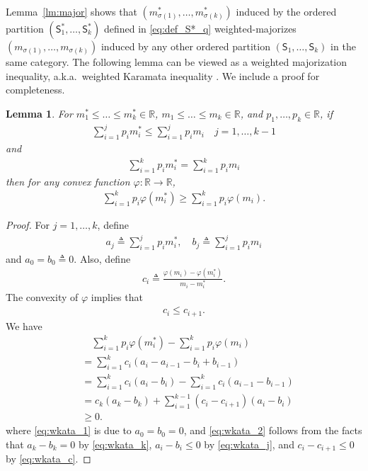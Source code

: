 \documentclass[conference]{IEEEtran}
\newtheorem{lemma}{Lemma}
\newcommand{\R}{\mathbb{R}}
\def\sS{{\mathsf S}}
\def\deq{\triangleq}
\begin{document}
Lemma~\ref{lm:major} shows that $(m^*_{\sigma(1)}, \ldots , m^*_{\sigma(k)})$ induced by the ordered partition $(\sS^*_1,\ldots,\sS^*_k)$ defined in \eqref{eq:def_S*_q} weighted-majorizes $( m_{\sigma(1)}, \ldots , m_{\sigma(k)})$ induced by any other ordered partition $(\sS_1,\ldots,\sS_k)$ in the same category.
The following lemma can be viewed as a weighted majorization inequality, a.k.a.\ weighted Karamata inequality \cite{Fuchs_weighted, Majorization_inequalities_IT}. 
We include a proof for completeness.
\begin{lemma}\label{lm:wkata}
For $m^*_1 \le \ldots \le m^*_k \in \R$, $m_{1} \le \ldots \le m_{k} \in \R$, and $p_1,\ldots, p_k \in \R$, if
\begin{align}
    \sum_{i=1}^j p_{i} m^*_{i}
    \le
    \sum_{i=1}^j p_{i} m_{i} \quad j=1,\ldots, k-1 \label{eq:wkata_j}
\end{align}
and 
\begin{align}
    \sum_{i=1}^k p_{i} m^*_{i}
    =
    \sum_{i=1}^k p_{i} m_{i} \label{eq:wkata_k}
\end{align}
then for any convex function $\varphi: \R \rightarrow \R$,
\begin{align}
    \sum_{i=1}^k p_{i} \varphi(m^*_{i})
    \ge
    \sum_{i=1}^k p_{i} \varphi( m_{i} ) .
\end{align}
\end{lemma}
\begin{proof}
For $j=1,\ldots,k$, define
\begin{align}
a_j \deq \sum_{i=1}^j p_i m^*_i, \quad
b_j \deq  \sum_{i=1}^j p_i m_i
\end{align}
and $a_0 = b_0 \deq 0$.
Also, define
\begin{align}
c_i \deq \frac{\varphi(m_i) - \varphi(m^*_i)}{m_i - m^*_i} .
\end{align}
The convexity of $\varphi$ implies that
\begin{align}
    c_i \le c_{i+1} . \label{eq:wkata_c}
\end{align}
We have
\begin{align}
    & \quad \sum_{i=1}^k p_{i} \varphi(m^*_{i})
    -
    \sum_{i=1}^k p_{i} \varphi( m_{i} ) \nonumber \\
    &= \sum_{i=1}^k c_i (a_i - a_{i-1} - b_i + b_{i-1}) \\
    &= \sum_{i=1}^k c_i (a_i - b_i)
    - \sum_{i=1}^k c_i (a_{i-1} - b_{i-1}) \\
    &= c_k(a_k-b_k) + \sum_{i=1}^{k-1}(c_i - c_{i+1})(a_i - b_i) \label{eq:wkata_1}\\ %
    &\ge 0 . \label{eq:wkata_2}
\end{align}
where \eqref{eq:wkata_1} is due to $a_0=b_0=0$, and \eqref{eq:wkata_2} follows from the facts that $a_k-b_k=0$ by \eqref{eq:wkata_k}, $a_i - b_i \le 0$ by \eqref{eq:wkata_j}, and $c_i - c_{i+1} \le 0$ by \eqref{eq:wkata_c}.
\end{proof}
\end{document}
